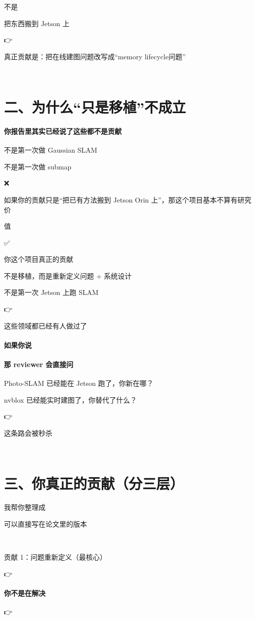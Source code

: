 \documentclass[12pt]{article}
\begin{document}
不是

把东西搬到 Jetson 上

👉

真正贡献是：把在线建图问题改写成“memory lifecycle问题”

🧠

\section{二、为什么“只是移植”不成立}
\paragraph{你报告里其实已经说了这些都不是贡献}
不是第一次做 Gaussian SLAM

不是第一次做 submap

❌

如果你的贡献只是“把已有方法搬到 Jetson Orin 上”，那这个项目基本不算有研究价

值

✅

你这个项目真正的贡献

不是移植，而是重新定义问题 + 系统设计

不是第一次 Jetson 上跑 SLAM

👉

这些领域都已经有人做过了

\paragraph{如果你说}
\paragraph{那 reviewer 会直接问}
Photo-SLAM 已经能在 Jetson 跑了，你新在哪？

nvblox 已经能实时建图了，你替代了什么？

👉

这条路会被秒杀

🧩

\section{三、你真正的贡献（分三层）}
我帮你整理成

可以直接写在论文里的版本

🥇

贡献 1：问题重新定义（最核心）

👉

\paragraph{你不是在解决}
👉
\end{document}
